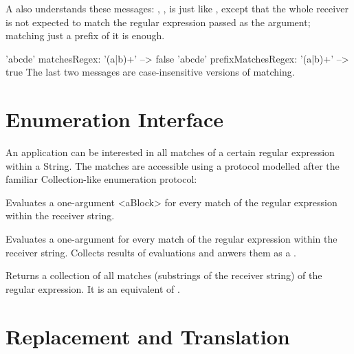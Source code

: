 \documentclass[a4paper,10pt,twoside]{book}
\begin{document}
{A   also understands these messages: 	
,  
,  is just like , except that the whole receiver is not expected to match the regular expression passed as the argument; matching just a prefix of it is enough.  

	
\begin{code}{}
'abcde' matchesRegex: '(a|b)+' --> false 	
'abcde' prefixMatchesRegex: '(a|b)+' --> true The last two messages are case-insensitive versions of matching. 	
\end{code}


\section{Enumeration Interface}

An application can be interested in all matches of a certain regular expression within a String.  The matches are accessible using a protocol modelled after the familiar Collection-like enumeration protocol: 

\begin{description}
\item {} Evaluates a one-argument <aBlock> for every match of the regular expression within the receiver string. 

\item {}
  Evaluates a one-argument  for every match of the regular expression within the receiver string. Collects results of evaluations and anwers them as a . 
  
\item {} Returns a collection of all matches (substrings of the receiver string) of the regular expression.  It is an equivalent of . 
\end{description}



\section{Replacement and Translation}

}
\end{document}
